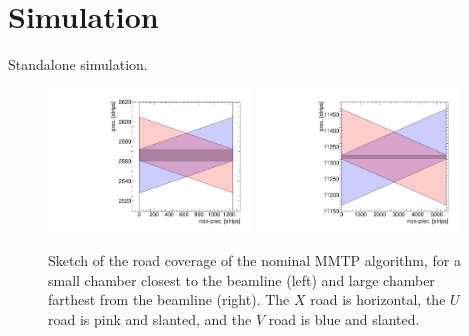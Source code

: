 \section{Simulation}
\label{sec:sim}

Standalone simulation.

\begin{figure}[!htpb]
  \begin{center}
    \includegraphics[width=0.48\textwidth]{figures/cartoon_roads_small_nominal.pdf}
    \includegraphics[width=0.48\textwidth]{figures/cartoon_roads_large_nominal.pdf}
  \end{center}
  \vspace{-10pt}
  \caption{Sketch of the road coverage of the nominal MMTP algorithm, for a small chamber closest to the beamline (left) and large chamber farthest from the beamline (right). The $X$ road is horizontal, the $U$ road is pink and slanted, and the $V$ road is blue and slanted.}
  \label{fig:cartoon_nominal}
\end{figure}

